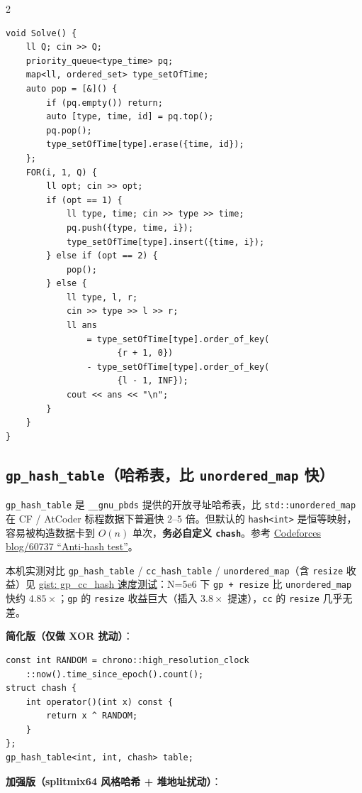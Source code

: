 \begin{multicols*}{2}
\begin{verbatim}
void Solve() {
    ll Q; cin >> Q;
    priority_queue<type_time> pq;
    map<ll, ordered_set> type_setOfTime;
    auto pop = [&]() {
        if (pq.empty()) return;
        auto [type, time, id] = pq.top();
        pq.pop();
        type_setOfTime[type].erase({time, id});
    };
    FOR(i, 1, Q) {
        ll opt; cin >> opt;
        if (opt == 1) {
            ll type, time; cin >> type >> time;
            pq.push({type, time, i});
            type_setOfTime[type].insert({time, i});
        } else if (opt == 2) {
            pop();
        } else {
            ll type, l, r;
            cin >> type >> l >> r;
            ll ans
                = type_setOfTime[type].order_of_key(
                      {r + 1, 0})
                - type_setOfTime[type].order_of_key(
                      {l - 1, INF});
            cout << ans << "\n";
        }
    }
}
		\end{verbatim}

		\subsection{\texttt{gp\_hash\_table}（哈希表，比 \texttt{unordered\_map} 快）}

		\verb|gp_hash_table| 是 \verb|__gnu_pbds| 提供的开放寻址哈希表，比 \verb|std::unordered_map| 在 CF / AtCoder 标程数据下普遍快 $2$--$5$ 倍。但默认的 \verb|hash<int>| 是恒等映射，容易被构造数据卡到 $O(n)$ 单次，\textbf{务必自定义 \texttt{chash}}。参考 \href{https://codeforces.com/blog/entry/60737}{Codeforces blog/60737 \enquote{Anti-hash test}}。

		本机实测对比 \verb|gp_hash_table| / \verb|cc_hash_table| / \verb|unordered_map|（含 \verb|resize| 收益）见 \href{https://gist.github.com/znzryb/b620166d705579fcecb02649ed5da03d}{gist: gp\_cc\_hash 速度测试}：N=5e6 下 \verb|gp + resize| 比 \verb|unordered_map| 快约 $4.85\times$；\verb|gp| 的 \verb|resize| 收益巨大（插入 $3.8\times$ 提速），\verb|cc| 的 \verb|resize| 几乎无差。

		\textbf{简化版（仅做 XOR 扰动）}：

		\begin{verbatim}
const int RANDOM = chrono::high_resolution_clock
    ::now().time_since_epoch().count();
struct chash {
    int operator()(int x) const {
        return x ^ RANDOM;
    }
};
gp_hash_table<int, int, chash> table;
		\end{verbatim}

		\textbf{加强版（splitmix64 风格哈希 + 堆地址扰动）}：


\end{multicols*}
